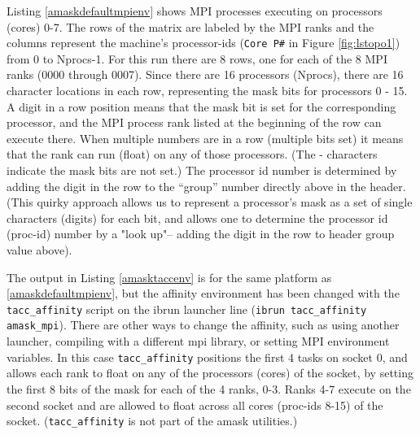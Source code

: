 \documentclass[10pt,a4paper]{report}
\begin{document}
Listing \ref{amaskdefaultmpienv} shows  MPI processes executing on processors (cores) 0-7. 
The rows of the matrix are labeled by the MPI ranks and the columns represent the
machine's processor-ids (\verb+Core P#+ in Figure \ref{fig:lstopo1}) from 0 to Nprocs-1.
For this run there are 8 rows, one for each of the 8 MPI ranks (0000 through 0007).
Since there are 16 processors (Nprocs), there are 16 character locations in each row, 
representing the mask bits for processors 0 - 15.
A digit in a row position means that the mask bit is set for the corresponding
processor, and the MPI process rank listed at the beginning of the row can execute there.
When multiple numbers 
are in a row (multiple bits set) it means that the rank can run (float) on any 
of those processors. (The - characters indicate the mask bits are not set.)
The processor id number is determined by adding the digit in the row to the ``group'' number
directly above in the header. (This quirky approach allows us to represent a 
processor's mask as a set of single characters (digits)
for each bit, and allows one to determine the processor id (proc-id) number by a "look up"-- 
adding the digit in the row to header group value above).



The output in Listing \ref{amasktaccenv} is for the same platform as 
\ref{amaskdefaultmpienv}, but the affinity environment has been changed with 
the \verb+tacc_affinity+ script on the ibrun launcher line (\verb+ibrun tacc_affinity amask_mpi+).
There are other ways to 
change the affinity, such as using another launcher, compiling with 
a different mpi library, or setting MPI environment variables.  In this case 
\verb+tacc_affinity+ positions the first 4 tasks on socket 0, and allows 
each rank to float on any of the processors (cores) of the socket, by setting the first 
8 bits of the mask for each of the 4 ranks, 0-3.  Ranks 4-7
execute on the second socket and are allowed to float across all cores (proc-ids 8-15) 
of the socket.  (\verb+tacc_affinity+ is not part of the amask utilities.)
\end{document}
